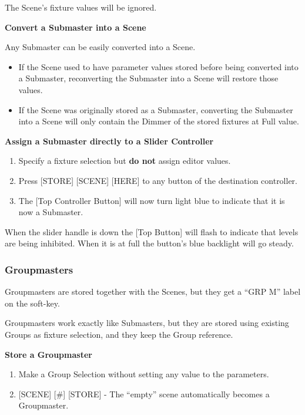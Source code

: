 \documentclass[
]{article}
\begin{document}
The Scene's fixture values will be ignored.

\textbf{Convert a Submaster into a Scene}

Any Submaster can be easily converted into a Scene.

\begin{itemize}
\item
  If the Scene used to have parameter values stored before being converted into a Submaster, reconverting the Submaster into a Scene will restore those values.
\item
  If the Scene was originally stored as a Submaster, converting the Submaster into a Scene will only contain the Dimmer of the stored fixtures at Full value.
\end{itemize}

\textbf{Assign a Submaster directly to a Slider Controller}

\begin{enumerate}
\def\labelenumi{\arabic{enumi}.}
\item
  Specify a fixture selection but \textbf{do not} assign editor values.
\item
  Press {[}STORE{]} {[}SCENE{]} {[}HERE{]} to any button of the destination controller.
\item
  The {[}Top Controller Button{]} will now turn {light blue} to indicate that it is now a Submaster.
\end{enumerate}

{When the slider handle is down the {[}Top Button{]} will flash to indicate that levels are being inhibited. When it is at full the button's blue backlight will go steady.}

\hypertarget{groupmasters}{%
\subsubsection{Groupmasters}\label{groupmasters}}

Groupmasters are stored together with the Scenes, but they get a ``GRP M'' label on the soft-key.

Groupmasters work exactly like Submasters, but they are stored using existing Groups as fixture selection, and they keep the Group reference.

\textbf{Store a Groupmaster}

\begin{enumerate}
\def\labelenumi{\arabic{enumi}.}
\item
  Make a Group Selection without setting any value to the parameters.
\item
  {[}SCENE{]} {[}\#{]} {[}STORE{]} - The ``empty'' scene automatically becomes a Groupmaster.
\end{enumerate}
\end{document}
